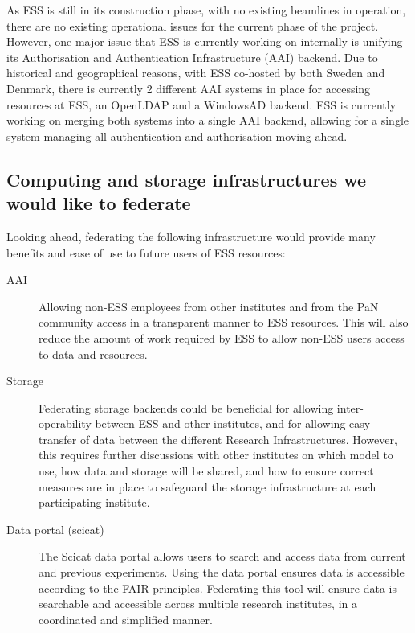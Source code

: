 As ESS is still in its construction phase, with no existing beamlines in operation, there are no existing operational issues for the current phase of the project.
However, one major issue that ESS is currently working on internally is unifying its Authorisation and Authentication Infrastructure (AAI) backend.
Due to historical and geographical reasons, with ESS co-hosted by both Sweden and Denmark, there is currently 2 different AAI systems in place for accessing resources at ESS, an OpenLDAP and a WindowsAD backend.
ESS is currently working on merging both systems into a single AAI backend, allowing for a single system managing all authentication and authorisation moving ahead.

\subsection{Computing and storage infrastructures we would like to federate}

Looking ahead, federating the following infrastructure would provide many benefits and ease of use to future users of ESS resources:

\begin{description}
  \item[AAI]
    Allowing non-ESS employees from other institutes and from the PaN community access in a transparent manner to ESS resources.
    This will also reduce the amount of work required by ESS to allow non-ESS users access to data and resources.
  \item[Storage]
    Federating storage backends could be beneficial for allowing inter-operability between ESS and other institutes, and for allowing easy transfer of data between the different Research Infrastructures.
    However, this requires further discussions with other institutes on which model to use, how data and storage will be shared, and how to ensure correct measures are in place to safeguard the storage infrastructure at each participating institute.
  \item[Data portal (scicat)]
    The Scicat data portal allows users to search and access data from current and previous experiments.
    Using the data portal ensures data is accessible according to the FAIR principles.
    Federating this tool will ensure data is searchable and accessible across multiple research institutes, in a coordinated and simplified manner.
\end{description}
